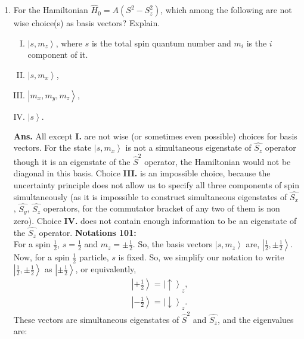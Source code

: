 \documentclass[12pt]{article}
\begin{document}
\begin{enumerate}[1.]
\newline
\item For the Hamiltonian $\hat{H}_0=A(S^2-S_z^2)$, which among the following are not wise choice(s) as basis vectors? Explain. %
       \begin{enumerate}[I.]
              \item $\left | s, m_z \right \rangle$, where $s$ is the total spin quantum number and $m_i$ is the $i$ component of it.
              \item $\left | s, m_x \right \rangle$,
              \item $\left | m_x, m_y, m_z \right \rangle$,
              \item $\left | s \right \rangle.$ \\
              \newline
       \end{enumerate}
\textbf{Ans.} All except \textbf{I.} are not wise (or sometimes even possible) choices for basis vectors. For the state $\left | s, m_x \right \rangle$ is not a simultaneous eigenstate of $\hat{S_z}$ operator though it is an eigenstate of the $\hat{S}^2$ operator, the Hamiltonian would not be diagonal in this basis. Choice \textbf{III.} is an impossible choice, because the uncertainty principle does not allow us to specify all three components of spin simultaneously (as it is impossible to construct simultaneous eigenstates of $\hat{S_x}$, $\hat{S_y}$, $\hat{S_z}$ operators, for the commutator bracket of any two of them is non zero). Choice \textbf{IV.} does not contain enough information to be an eigenstate of the $\hat{S_z}$ operator.
\newpage
\textbf{Notations 101:} \\
For a spin $\frac{1}{2}$, $s=\frac{1}{2}$ and $m_z=\pm \frac{1}{2}$. So, the basis vectors $\left | s, m_z \right \rangle $ are, $\left | \frac{1}{2}, \pm \frac{1}{2} \right \rangle$. Now, for a spin $\frac{1}{2}$ particle, $s$ is fixed. So, we simplify our notation to write $\left | \frac{1}{2}, \pm \frac{1}{2} \right \rangle$ as $\left | \pm \frac {1} {2} \right \rangle$, or equivalently, $$ \begin{aligned} & \left | + \frac {1} {2} \right \rangle = \left | \uparrow \right \rangle _z, \\ & \left | - \frac {1} {2} \right \rangle = \left | \downarrow \right \rangle _z. \end{aligned} $$
These vectors are simultaneous eigenstates of $\hat{S}^2$ and $\hat{S_z}$, and the eigenvalues are:
$$
\begin{aligned}

\end{aligned}$$
\end{enumerate}
\end{document}
